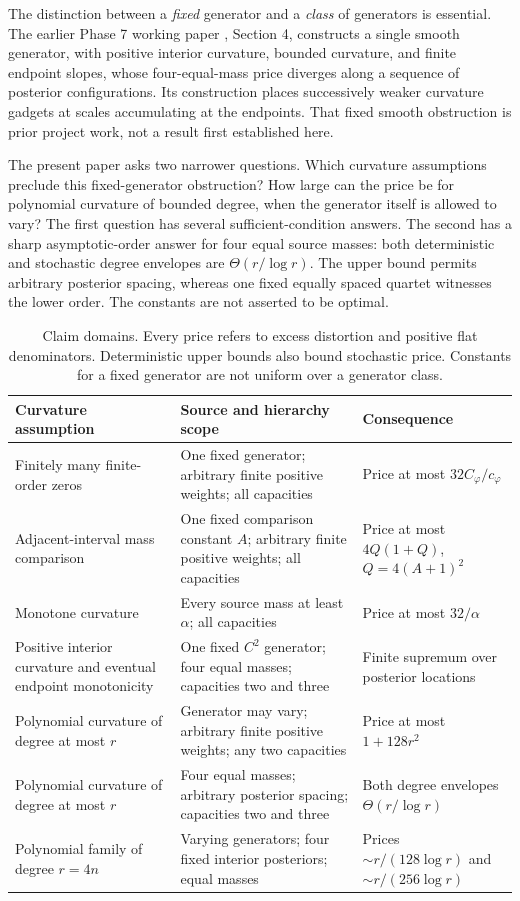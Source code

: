 \documentclass[11pt]{article}
\theoremstyle{definition}\newtheorem{definition}[theorem]{Definition}
\theoremstyle{remark}\newtheorem{remark}[theorem]{Remark}
\newcommand{\ph}{\varphi}
\begin{document}
The distinction between a \emph{fixed} generator and a \emph{class} of generators is essential. The earlier Phase 7 working paper \cite{huang7}, Section 4, constructs a single smooth generator, with positive interior curvature, bounded curvature, and finite endpoint slopes, whose four-equal-mass price diverges along a sequence of posterior configurations. Its construction places successively weaker curvature gadgets at scales accumulating at the endpoints. That fixed smooth obstruction is prior project work, not a result first established here.

The present paper asks two narrower questions. Which curvature assumptions preclude this fixed-generator obstruction? How large can the price be for polynomial curvature of bounded degree, when the generator itself is allowed to vary? The first question has several sufficient-condition answers. The second has a sharp asymptotic-order answer for four equal source masses: both deterministic and stochastic degree envelopes are $\Theta(r/\log r)$. The upper bound permits arbitrary posterior spacing, whereas one fixed equally spaced quartet witnesses the lower order. The constants are not asserted to be optimal.

\begin{table}[ht]
\centering\small
\begin{tabular}{@{}>{\raggedright\arraybackslash}p{}>{\raggedright\arraybackslash}p{}>{\raggedright\arraybackslash}p{}@{}}
\toprule
Curvature assumption & Source and hierarchy scope & Consequence \\
\midrule
Finitely many finite-order zeros & One fixed generator; arbitrary finite positive weights; all capacities & Price at most $32C_\ph/c_\ph$ \\
Adjacent-interval mass comparison & One fixed comparison constant $A$; arbitrary finite positive weights; all capacities & Price at most $4Q(1+Q)$, $Q=4(A+1)^2$ \\
Monotone curvature & Every source mass at least $\alpha$; all capacities & Price at most $32/\alpha$ \\
Positive interior curvature and eventual endpoint monotonicity & One fixed $C^2$ generator; four equal masses; capacities two and three & Finite supremum over posterior locations \\
Polynomial curvature of degree at most $r$ & Generator may vary; arbitrary finite positive weights; any two capacities & Price at most $1+128r^2$ \\
Polynomial curvature of degree at most $r$ & Four equal masses; arbitrary posterior spacing; capacities two and three & Both degree envelopes $\Theta(r/\log r)$ \\
Polynomial family of degree $r=4n$ & Varying generators; four fixed interior posteriors; equal masses & Prices $\sim r/(128\log r)$ and $\sim r/(256\log r)$ \\
\bottomrule
\end{tabular}
\caption{Claim domains. Every price refers to excess distortion and positive flat denominators. Deterministic upper bounds also bound stochastic price. Constants for a fixed generator are not uniform over a generator class.}
\label{tab:scope}
\end{table}
\end{document}
